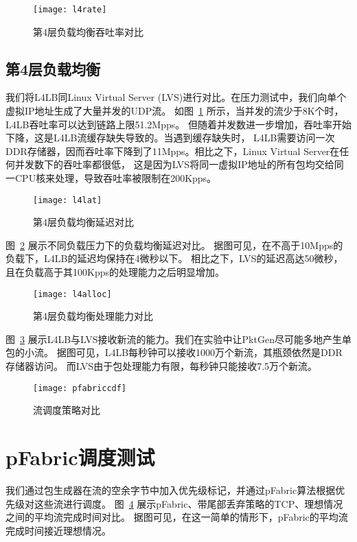 \begin{figure}[htbp]
\centering
\texttt{[image: l4rate]}
\caption{第4层负载均衡吞吐率对比} \label{fig:l4rate}
\end{figure}

\subsection{第4层负载均衡}
我们将L4LB同Linux Virtual Server (LVS)\cite{lvs}进行对比。在压力测试中，我们向单个虚拟IP地址生成了大量并发的UDP流。
如图~\ref{fig:l4rate} 所示，当并发的流少于8K个时，L4LB吞吐率可以达到链路上限51.2Mpps。
但随着并发数进一步增加，吞吐率开始下降，这是L4LB流缓存缺失导致的。当遇到缓存缺失时，
L4LB需要访问一次DDR存储器，因而吞吐率下降到了11Mpps。相比之下，Linux Virtual Server在任何并发数下的吞吐率都很低，
这是因为LVS将同一虚拟IP地址的所有包均交给同一CPU核来处理，导致吞吐率被限制在200Kpps。

\begin{figure}[htbp]
\centering
\texttt{[image: l4lat]}
\caption{第4层负载均衡延迟对比} \label{fig:l4lat}
\end{figure}
图~\ref{fig:l4lat} 展示不同负载压力下的负载均衡延迟对比。
据图可见，在不高于10Mpps的负载下，L4LB的延迟均保持在4微秒以下。
相比之下，LVS的延迟高达50微秒，且在负载高于其100Kpps的处理能力之后明显增加。

\begin{figure}[htbp]
\centering
\texttt{[image: l4alloc]}
\caption{第4层负载均衡处理能力对比} \label{fig:l4alloc}
\end{figure}
图~\ref{fig:l4alloc} 展示L4LB与LVS接收新流的能力。我们在实验中让PktGen尽可能多地产生单包的小流。
据图可见，L4LB每秒钟可以接收1000万个新流，其瓶颈依然是DDR存储器访问。
而LVS由于包处理能力有限，每秒钟只能接收7.5万个新流。

\begin{figure}[htbp]
\centering
\texttt{[image: pfabriccdf]}
\caption{流调度策略对比} \label{fig:pfabriccdf}
\end{figure}

\section{pFabric调度测试}
我们通过包生成器在流的空余字节中加入优先级标记，并通过pFabric算法\cite{Alizadeh:2013:PMN:2486001.2486031}根据优先级对这些流进行调度。
图~\ref{fig:pfabriccdf} 展示pFabric、带尾部丢弃策略的TCP、理想情况之间的平均流完成时间对比。
据图可见，在这一简单的情形下，pFabric的平均流完成时间接近理想情况。
